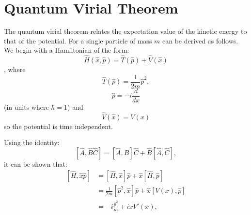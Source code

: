 \documentclass[12pt]{article}
\begin{document}
\appendix
    \section{Quantum Virial Theorem}
        \label{ap:Quantum Virial Theorem}
        The quantum virial theorem relates the expectation value of the kinetic energy to that of the potential. For a single particle of mass $m$ can be derived as follows. We begin with a Hamiltonian of the form:
        \begin{equation}
            \label{eq:VirialHamiltonian}
            \hat{H}\left(\hat{x},\hat{p}\right) = \hat{T}\left(\hat{p}\right)+\hat{V}\left(\hat{x}\right)  
        \end{equation},
        where
        \begin{equation}
            \label{eq:VirialKinetic}
            \hat{T}\left(\hat{p}\right) = \frac{1}{2m}\hat{p}^2,
        \end{equation}
        \begin{equation}
            \label{eq:VirialMomentumOperator}
            \hat{p} = -i\frac{d}{dx}
        \end{equation}
        (in units where $\hbar=1$) and
        \begin{equation}
            \label{eq:VirialPotentialOperator} \hat{V}\left(\hat{x}\right) = V\left(x\right)
        \end{equation}
        so the potential is time independent.

        Using the identity:
        \begin{equation}
            \label{eq:CommutatorABC}
            \left[\hat{A},\hat{B}\hat{C}\right] = \left[\hat{A},\hat{B}\right]\hat{C}+\hat{B}\left[\hat{A},\hat{C}\right],
        \end{equation}
        it can be shown that:
        \begin{align}
            \label{eq:VirialHCommutator1} \left[\hat{H},\hat{x}\hat{p}\right] & = \left[\hat{H},\hat{x}\right]\hat{p} + \hat{x}\left[\hat{H},\hat{p}\right] \\
            \label{eq:VirialHCommutator2} & = \frac{1}{2m}\left[\hat{p}^2,\hat{x}\right]\hat{p}+\hat{x}\left[V\left(x\right),\hat{p}\right] \\
            \label{eq:VirialHCommutator2} & = -i\frac{\hat{p}^2}{m} + ixV'\left(x\right),
        \end{align}
\end{document}
